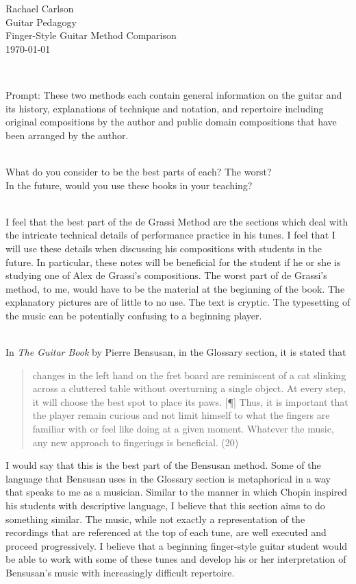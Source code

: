 \documentclass[12pt]{article}
\begin{document}
\noindent Rachael Carlson\\
\noindent Guitar Pedagogy\\
\noindent Finger-Style Guitar Method Comparison\\
\noindent \today\\
\strut\\
\raggedright
\noindent Prompt: These two methods each contain general information on the guitar and its history, explanations of technique and notation, and repertoire including original compositions by the author and public domain compositions that have been arranged by the author.\\
\strut\\
\noindent What do you consider to be the best parts of each? The worst?\\
\noindent In the future, would you use these books in your teaching?\\
\strut\\
\noindent I feel that the best part of the de Grassi Method are the sections which deal with the intricate technical details of performance practice in his tunes. I feel that I will use these details when discussing his compositions with students in the future. In particular, these notes will be beneficial for the student if he or she is studying one of Alex de Grassi's compositions. The worst part of de Grassi's method, to me, would have to be the material at the beginning of the book. The explanatory pictures are of little to no use. The text is cryptic. The typesetting of the music can be potentially confusing to a beginning player.\\
\strut\\
In \emph{The Guitar Book} by Pierre Bensusan, in the Glossary section, it is stated that
\begin{quote}
changes in the left hand on the fret board are reminiscent of a cat slinking across a cluttered table without overturning a single object. At every step, it will choose the best spot to place its paws. [¶] Thus, it is important that the player remain curious and not limit himself to what the fingers are familiar with or feel like doing at a given moment. Whatever the music, any new approach to fingerings is beneficial. (20)
\end{quote}
I would say that this is the best part of the Bensusan method. Some of the language that Bensusan uses in the Glossary section is metaphorical in a way that speaks to me as a musician. Similar to the manner in which Chopin inspired his students with descriptive language, I believe that this section aims to do something similar. The music, while not exactly a representation of the recordings that are referenced at the top of each tune, are well executed and proceed progressively. I believe that a beginning finger-style guitar student would be able to work with some of these tunes and develop his or her interpretation of Bensusan's music with increasingly difficult repertoire.\\
\end{document}
